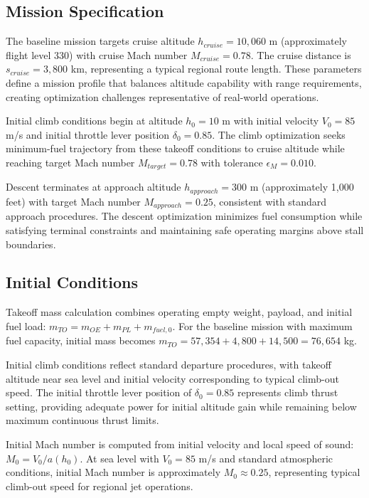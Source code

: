 \subsection{Mission Specification}

The baseline mission targets cruise altitude $h_{cruise} = 10,060$ m (approximately flight level 330) with cruise Mach number $M_{cruise} = 0.78$. The cruise distance is $s_{cruise} = 3,800$ km, representing a typical regional route length. These parameters define a mission profile that balances altitude capability with range requirements, creating optimization challenges representative of real-world operations.

Initial climb conditions begin at altitude $h_0 = 10$ m with initial velocity $V_0 = 85$ m/s and initial throttle lever position $\delta_0 = 0.85$. The climb optimization seeks minimum-fuel trajectory from these takeoff conditions to cruise altitude while reaching target Mach number $M_{target} = 0.78$ with tolerance $\epsilon_M = 0.010$.

Descent terminates at approach altitude $h_{approach} = 300$ m (approximately 1,000 feet) with target Mach number $M_{approach} = 0.25$, consistent with standard approach procedures. The descent optimization minimizes fuel consumption while satisfying terminal constraints and maintaining safe operating margins above stall boundaries.

\subsection{Initial Conditions}

Takeoff mass calculation combines operating empty weight, payload, and initial fuel load: $m_{TO} = m_{OE} + m_{PL} + m_{fuel,0}$. For the baseline mission with maximum fuel capacity, initial mass becomes $m_{TO} = 57,354 + 4,800 + 14,500 = 76,654$ kg.

Initial climb conditions reflect standard departure procedures, with takeoff altitude near sea level and initial velocity corresponding to typical climb-out speed. The initial throttle lever position of $\delta_0 = 0.85$ represents climb thrust setting, providing adequate power for initial altitude gain while remaining below maximum continuous thrust limits.

Initial Mach number is computed from initial velocity and local speed of sound: $M_0 = V_0/a(h_0)$. At sea level with $V_0 = 85$ m/s and standard atmospheric conditions, initial Mach number is approximately $M_0 \approx 0.25$, representing typical climb-out speed for regional jet operations.

